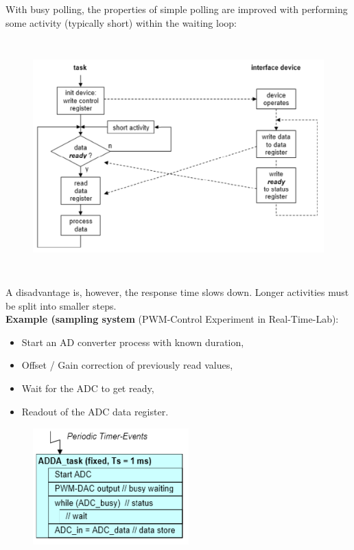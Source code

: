 With busy polling, the properties of simple polling are improved with performing some activity (typically short) within the waiting loop:

 	\begin{figure}[h]
    \centering
    \includegraphics[width=14cm, height=9cm]{Images/image124.png}
    \label{fig:Fig 73}
    \end{figure}

A disadvantage is, however, the response time slows down. Longer activities must be split into smaller steps.\\

\textbf{Example (sampling system }(PWM-Control Experiment in Real-Time-Lab): 

\begin{itemize}
	\item  Start an AD converter process with known duration, 
	\item  Offset / Gain correction of previously read values,
	\item  Wait for the ADC to get ready,
	\item  Readout of the ADC data register.
\end{itemize}

 	\begin{figure}[h]
    \centering
    \includegraphics[width=6cm, height=4.5cm]{Images/image125.png}
    \label{fig:Fig 74}
    \end{figure}
\newpage
